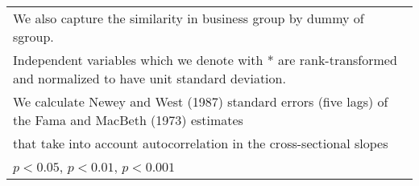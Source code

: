 {\begin{tabular}{l*{6}{c}}
\multicolumn{7}{l}{\footnotesize We also capture the similarity in business group by dummy of sgroup.}\\
\multicolumn{7}{l}{\footnotesize Independent variables which  we denote with * are rank-transformed and normalized to have unit standard deviation.}\\
\multicolumn{7}{l}{\footnotesize  We calculate Newey and West (1987) standard errors (five lags) of the Fama and MacBeth (1973) estimates }\\
\multicolumn{7}{l}{\footnotesize  that take into account autocorrelation in the cross-sectional slopes}\\
\multicolumn{7}{l}{\footnotesize \sym{*} \(p<0.05\), \sym{**} \(p<0.01\), \sym{***} \(p<0.001\)}\\
\end{tabular}
}
